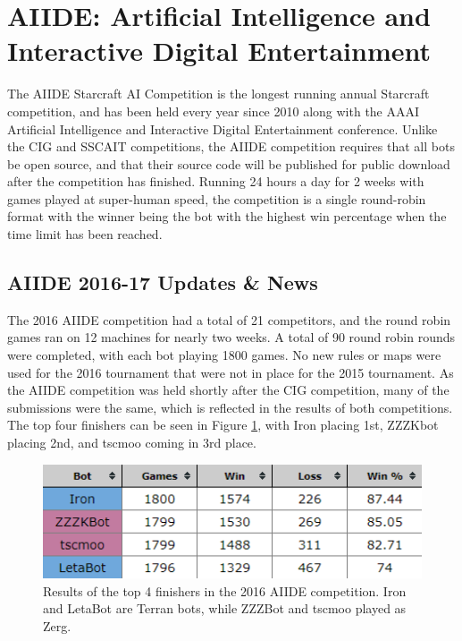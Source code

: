 \section{AIIDE: Artificial Intelligence and Interactive Digital Entertainment}\label{subsecAIIDE}

The AIIDE Starcraft AI Competition is the longest running annual Starcraft competition, and has been held every year since 2010 along with the AAAI Artificial Intelligence and Interactive Digital Entertainment conference. Unlike the CIG and SSCAIT competitions, the AIIDE competition requires that all bots be open source, and that their source code will be published for public download after the competition has finished. Running 24 hours a day for 2 weeks with games played at super-human speed, the competition is a single round-robin format with the winner being the bot with the highest win percentage when the time limit has been reached. 

\subsection*{AIIDE 2016-17 Updates \& News}\label{subsecAIIDEnews}

The 2016 AIIDE competition had a total of 21 competitors, and the round robin games ran on 12 machines for nearly two weeks. A total of 90 round robin rounds were completed, with each bot playing 1800 games. No new rules or maps were used for the 2016 tournament that were not in place for the 2015 tournament. As the AIIDE competition was held shortly after the CIG competition, many of the submissions were the same, which is reflected in the results of both competitions. The top four finishers can be seen in Figure \ref{figAIIDEresults}, with Iron placing 1st, ZZZKbot placing 2nd, and tscmoo coming in 3rd place.

\vskip 2mm
\begin{figure}[h]
  \centering
  \includegraphics[width=1\columnwidth]{fig/aiide2016.png}
  \caption{Results of the top 4 finishers in the 2016 AIIDE competition. Iron and LetaBot are Terran bots, while ZZZBot and tscmoo played as Zerg.}
  \label{figAIIDEresults}
\end{figure}

